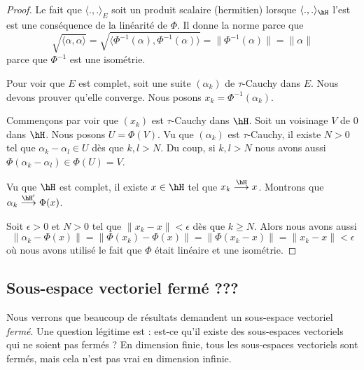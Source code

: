 \begin{proof}
	Le fait que \( \langle ., .\rangle_E\) soit un produit scalaire (hermitien) lorsque \( \langle ., .\rangle_{\hH}\) l'est est une conséquence de la linéarité de \( \Phi\). Il donne la norme parce que
	\begin{equation}
		\sqrt{ \langle \alpha , \alpha\rangle  }=\sqrt{ \langle \Phi^{-1}(\alpha), \Phi^{-1}(\alpha)\rangle  }=\| \Phi^{-1}(\alpha) \|=\| \alpha \|
	\end{equation}
	parce que \( \Phi^{-1}\) est une isométrie.

	Pour voir que \( E\) est complet, soit une suite \( (\alpha_k)\) de \( \tau\)-Cauchy dans \( E\). Nous devons prouver qu'elle converge. Nous posons \( x_k=\Phi^{-1}(\alpha_k)\).

	Commençons par voir que \( (x_k)\) est \( \tau\)-Cauchy dans \( \hH\). Soit un voisinage \( V\) de \( 0\) dans \( \hH\). Nous posons \( U=\Phi(V)\). Vu que \( (\alpha_k)\) est \( \tau\)-Cauchy, il existe \( N>0\) tel que \( \alpha_k-\alpha_l\in U\) dès que \( k,l>N\). Du coup, si \( k,l>N\) nous avons aussi \( \Phi(\alpha_k-\alpha_l)\in \Phi(U)=V\).

	Vu que \( \hH\) est complet, il existe \( x\in \hH\) tel que \( x_k\stackrel{\hH}{\longrightarrow}x\). Montrons que \( \alpha_k\stackrel{\hH'}{\longrightarrow}\Phi(x)\).

	Soit \( \epsilon>0\) et \( N>0\) tel que \( \| x_k-x \|<\epsilon\) dès que \( k\geq N\). Alors nous avons aussi
	\begin{equation}
		\| \alpha_k-\Phi(x) \|=\| \Phi(x_k)-\Phi(x) \|=\| \Phi(x_k-x) \|=\| x_k-x \|<\epsilon
	\end{equation}
	où nous avons utilisé le fait que \( \Phi\) était linéaire et une isométrie.
\end{proof}

\subsection{Sous-espace vectoriel fermé ???}

Nous verrons que beaucoup de résultats demandent un sous-espace vectoriel \emph{fermé}. Une question légitime est : est-ce qu'il existe des sous-espaces vectoriels qui ne soient pas fermés ? En dimension finie, tous les sous-espaces vectoriels sont fermés, mais cela n'est pas vrai en dimension infinie.

